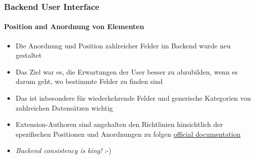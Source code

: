 \begin{frame}[fragile]
	\frametitle{Backend User Interface}
	\framesubtitle{Position and Anordnung von Elementen}

	\begin{itemize}
		\item Die Anordnung und Position zahlreicher Felder im Backend wurde neu gestaltet
		\item Das Ziel war es, die Erwartungen der User besser zu abzubilden, wenn es darum geht, wo bestimmte Felder zu finden sind
		\item Das ist inbesondere für wiederkehrende Felder und generische Kategorien von zahlreichen Datensätzen wichtig
		\item Extension-Authoren sind angehalten den Richtlinien hinsichtlich der spezifischen Positionen und Anordnungen zu folgen \href{https://docs.typo3.org}{official documentation}


	\end{itemize}

	\begin{itemize}
		\item \textit{Backend consistency is king!} :-)
	\end{itemize}

\end{frame}

